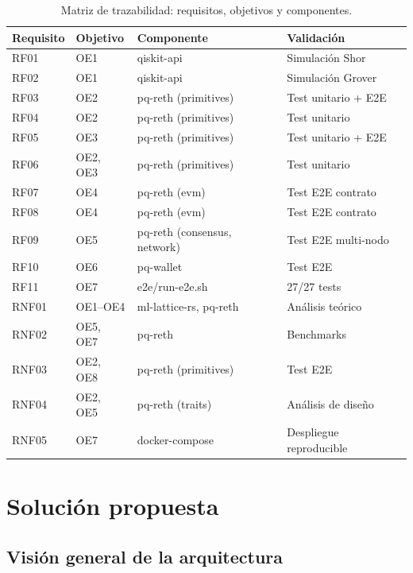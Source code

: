\begin{table}[htbp]
\centering
\caption{Matriz de trazabilidad: requisitos, objetivos y componentes.}
\label{tab:trazabilidad}
\begin{tabular}{@{}llll@{}}
\toprule
\textbf{Requisito} & \textbf{Objetivo} & \textbf{Componente} & \textbf{Validación} \\
\midrule
RF01 & OE1 & qiskit-api & Simulación Shor \\
RF02 & OE1 & qiskit-api & Simulación Grover \\
RF03 & OE2 & pq-reth (primitives) & Test unitario + E2E \\
RF04 & OE2 & pq-reth (primitives) & Test unitario \\
RF05 & OE3 & pq-reth (primitives) & Test unitario + E2E \\
RF06 & OE2, OE3 & pq-reth (primitives) & Test unitario \\
RF07 & OE4 & pq-reth (evm) & Test E2E contrato \\
RF08 & OE4 & pq-reth (evm) & Test E2E contrato \\
RF09 & OE5 & pq-reth (consensus, network) & Test E2E multi-nodo \\
RF10 & OE6 & pq-wallet & Test E2E \\
RF11 & OE7 & e2e/run-e2e.sh & 27/27 tests \\
RNF01 & OE1--OE4 & ml-lattice-rs, pq-reth & Análisis teórico \\
RNF02 & OE5, OE7 & pq-reth & Benchmarks \\
RNF03 & OE2, OE8 & pq-reth (primitives) & Test E2E \\
RNF04 & OE2, OE5 & pq-reth (traits) & Análisis de diseño \\
RNF05 & OE7 & docker-compose & Despliegue reproducible \\
\bottomrule
\end{tabular}
\end{table}


\section{Solución propuesta}
\label{sec:solucion}

\subsection{Visión general de la arquitectura}

